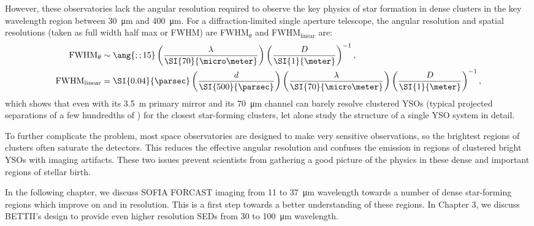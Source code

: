 However, these observatories lack the angular resolution required to observe the key physics of star formation in dense clusters in the key wavelength region between \SI{30}{\micro\meter} and \SI{400}{\micro\meter}. For a diffraction-limited single aperture telescope, the angular resolution and spatial resolutions (taken as full width half max or FWHM) are FWHM$_\theta$ and FWHM$_\textrm{linear}$ are:
\begin{align}
\textrm{FWHM}_\theta &\sim \ang{;;15}\left(\frac{\lambda}{\SI{70}{\micro\meter}}\right)\left(\frac{D}{\SI{1}{\meter}}\right)^{-1}, \\
\textrm{FWHM}_\textrm{linear} &= \SI{0.04}{\parsec}\left(\frac{d}{\SI{500}{\parsec}}\right)\left(\frac{\lambda}{\SI{70}{\micro\meter}}\right)\left(\frac{D}{\SI{1}{\meter}}\right)^{-1},
\end{align}
which shows that even \Herschel with its \SI{3.5}{\meter} primary mirror and its \SI{70}{\micro\meter} channel can barely resolve clustered YSOs (typical projected separations of a few hundredths of \si{\parsec}) for the closest star-forming clusters, let alone study the structure of a single YSO system in detail. 

To further complicate the problem, most space observatories are designed to make very sensitive observations, so the brightest regions of clusters often saturate the detectors. This reduces the
effective angular resolution and confuses the emission in regions of clustered bright YSOs with imaging
artifacts. These two issues prevent scientists from gathering a good picture of the physics in these dense and important regions of stellar birth.

In the following chapter, we discuss SOFIA FORCAST imaging from 11 to \SI{37}{\um}
wavelength towards a number of dense star-forming regions which improve on \Spitzer and
\Herschel in resolution. This is a first step towards a better understanding of these regions. 
In Chapter 3, we discuss BETTII's design to provide even higher resolution SEDs from 30 to
\SI{100}{\um} wavelength.


